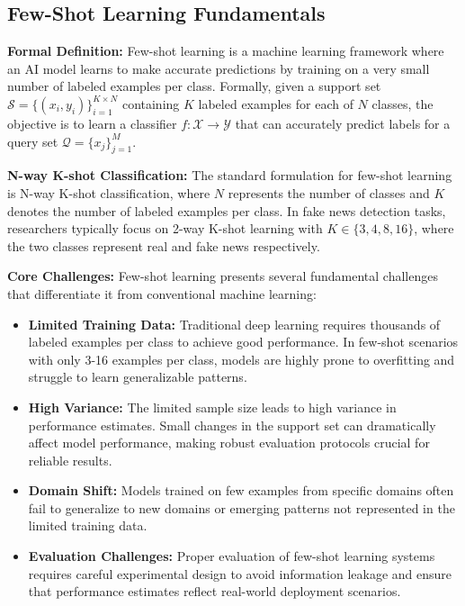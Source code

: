 \subsection{Few-Shot Learning Fundamentals}

\textbf{Formal Definition:} Few-shot learning is a machine learning framework where an AI model learns to make accurate predictions by training on a very small number of labeled examples per class. Formally, given a support set $\mathcal{S} = \{(x_i, y_i)\}_{i=1}^{K \times N}$ containing $K$ labeled examples for each of $N$ classes, the objective is to learn a classifier $f: \mathcal{X} \rightarrow \mathcal{Y}$ that can accurately predict labels for a query set $\mathcal{Q} = \{x_j\}_{j=1}^{M}$.

\textbf{N-way K-shot Classification:} The standard formulation for few-shot learning is N-way K-shot classification, where $N$ represents the number of classes and $K$ denotes the number of labeled examples per class. In fake news detection tasks, researchers typically focus on 2-way K-shot learning with $K \in \{3, 4, 8, 16\}$, where the two classes represent real and fake news respectively.

\textbf{Core Challenges:} Few-shot learning presents several fundamental challenges that differentiate it from conventional machine learning:

\begin{itemize}
\item \textbf{Limited Training Data:} Traditional deep learning requires thousands of labeled examples per class to achieve good performance. In few-shot scenarios with only 3-16 examples per class, models are highly prone to overfitting and struggle to learn generalizable patterns.
\item \textbf{High Variance:} The limited sample size leads to high variance in performance estimates. Small changes in the support set can dramatically affect model performance, making robust evaluation protocols crucial for reliable results.
\item \textbf{Domain Shift:} Models trained on few examples from specific domains often fail to generalize to new domains or emerging patterns not represented in the limited training data.
\item \textbf{Evaluation Challenges:} Proper evaluation of few-shot learning systems requires careful experimental design to avoid information leakage and ensure that performance estimates reflect real-world deployment scenarios.
\end{itemize}

